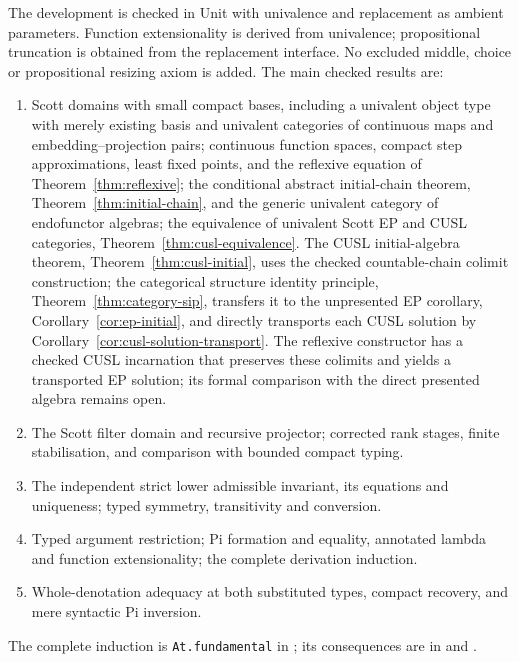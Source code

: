 \documentclass[11pt,a4paper]{article}
\theoremstyle{definition}
\theoremstyle{remark}
\begin{document}
The development is checked in Unit with univalence and replacement as
ambient parameters. Function extensionality is derived from univalence;
propositional truncation is obtained from the replacement interface.
No excluded middle, choice or propositional resizing axiom is added.
The main checked results are:
\begin{enumerate}[leftmargin=*,itemsep=3pt]
\item Scott domains with small compact bases, including a univalent object
type with merely existing basis and univalent categories of continuous
maps and embedding--projection pairs; continuous function spaces,
compact step approximations, least fixed points, and the reflexive
equation of Theorem~\ref{thm:reflexive}; the conditional abstract
initial-chain theorem, Theorem~\ref{thm:initial-chain}, and the generic
univalent category of endofunctor algebras; the equivalence of univalent
Scott EP and CUSL categories, Theorem~\ref{thm:cusl-equivalence}.
The CUSL initial-algebra theorem, Theorem~\ref{thm:cusl-initial},
uses the checked countable-chain colimit construction; the categorical
structure identity principle, Theorem~\ref{thm:category-sip}, transfers it to
the unpresented EP corollary, Corollary~\ref{cor:ep-initial}, and directly
transports each CUSL solution by Corollary~\ref{cor:cusl-solution-transport}.
The reflexive constructor has a checked CUSL incarnation that preserves
these colimits and yields a transported EP solution; its formal comparison
with the direct presented algebra remains open.
\item The Scott filter domain and recursive projector; corrected rank
stages, finite stabilisation, and comparison with bounded compact typing.
\item The independent strict lower admissible invariant, its equations
and uniqueness; typed symmetry, transitivity and conversion.
\item Typed argument restriction; Pi formation and equality, annotated
lambda and function extensionality; the complete derivation induction.
\item Whole-denotation adequacy at both substituted types, compact
recovery, and mere syntactic Pi inversion.
\end{enumerate}
The complete induction is \texttt{At.fundamental} in
; its consequences are in
 and .
\end{document}
